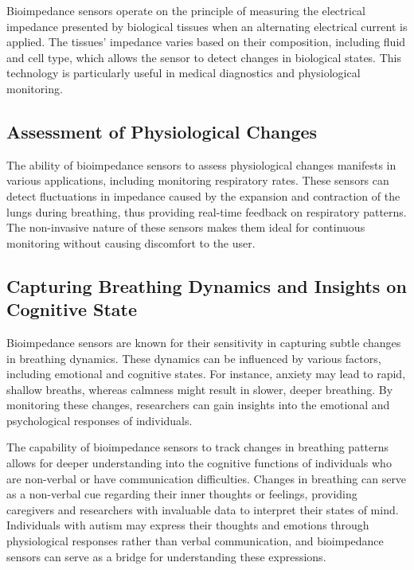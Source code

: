 \documentclass[twocolumn]{article}
\begin{document}
Bioimpedance sensors operate on the principle of measuring the electrical impedance presented by biological tissues when an alternating electrical current is applied. The tissues' impedance varies based on their composition, including fluid and cell type, which allows the sensor to detect changes in biological states.\cite{Janusz_Roudjane_Mantovani_Messaddeq_Gosselin_2022} This technology is particularly useful in medical diagnostics and physiological monitoring.

\subsection{Assessment of Physiological Changes}

The ability of bioimpedance sensors to assess physiological changes manifests in various applications, including monitoring respiratory rates. These sensors can detect fluctuations in impedance caused by the expansion and contraction of the lungs during breathing, thus providing real-time feedback on respiratory patterns.\cite{Janusz_Roudjane_Mantovani_Messaddeq_Gosselin_2022} The non-invasive nature of these sensors makes them ideal for continuous monitoring without causing discomfort to the user.

\subsection{Capturing Breathing Dynamics and Insights on Cognitive State}

Bioimpedance sensors are known for their sensitivity in capturing subtle changes in breathing dynamics. These dynamics can be influenced by various factors, including emotional and cognitive states. For instance, anxiety may lead to rapid, shallow breaths, whereas calmness might result in slower, deeper breathing. \cite{Janusz_Roudjane_Mantovani_Messaddeq_Gosselin_2022} By monitoring these changes, researchers can gain insights into the emotional and psychological responses of individuals.

The capability of bioimpedance sensors to track changes in breathing patterns allows for deeper understanding into the cognitive functions of individuals who are non-verbal or have communication difficulties. Changes in breathing can serve as a non-verbal cue regarding their inner thoughts or feelings, providing caregivers and researchers with invaluable data to interpret their states of mind. Individuals with autism may express their thoughts and emotions through physiological responses rather than verbal communication, and bioimpedance sensors can serve as a bridge for understanding these expressions.\cite{Janusz_Roudjane_Mantovani_Messaddeq_Gosselin_2022}
\end{document}
